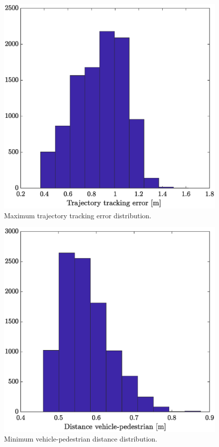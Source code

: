 \begin{figure}
	\centering
	\includegraphics[scale=0.4]{figure/Part2/Chapter5/Images/err_traj.eps} 
	\caption{Maximum trajectory tracking error distribution.}
	\label{fig:episodetest}
\end{figure}


\begin{figure}
	\centering
	\includegraphics[scale=0.4]{figure/Part2/Chapter5/Images/err_ped_estrian.eps}
	\caption{Minimum vehicle-pedestrian distance distribution.}
	\label{fig:errorepisode}
\end{figure}

